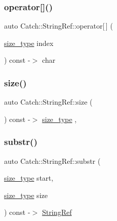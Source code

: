 \subsubsection{\texorpdfstring{operator[]()}{operator[]()}}
{\footnotesize\ttfamily auto Catch\+::\+String\+Ref\+::operator\mbox{[}$\,$\mbox{]} (\begin{DoxyParamCaption}\item[{\mbox{\hyperlink{class_catch_1_1_string_ref_a06b4db8fc82b197004291cf370b2ba7c}{size\+\_\+type}}}]{index }\end{DoxyParamCaption}) const -\/$>$  char\hspace{0.3cm}{\ttfamily [noexcept]}}

\mbox{\label{class_catch_1_1_string_ref_ae084d72cb2952cee61a63ef36611d0ad}} 
\subsubsection{\texorpdfstring{size()}{size()}}
{\footnotesize\ttfamily auto Catch\+::\+String\+Ref\+::size (\begin{DoxyParamCaption}{ }\end{DoxyParamCaption}) const -\/$>$ \mbox{\hyperlink{class_catch_1_1_string_ref_a06b4db8fc82b197004291cf370b2ba7c}{size\+\_\+type}} \hspace{0.3cm}{\ttfamily [inline]}, {\ttfamily [noexcept]}}

\mbox{\label{class_catch_1_1_string_ref_a248568b467cf6599320903ae613c8eee}} 
\subsubsection{\texorpdfstring{substr()}{substr()}}
{\footnotesize\ttfamily auto Catch\+::\+String\+Ref\+::substr (\begin{DoxyParamCaption}\item[{\mbox{\hyperlink{class_catch_1_1_string_ref_a06b4db8fc82b197004291cf370b2ba7c}{size\+\_\+type}}}]{start,  }\item[{\mbox{\hyperlink{class_catch_1_1_string_ref_a06b4db8fc82b197004291cf370b2ba7c}{size\+\_\+type}}}]{size }\end{DoxyParamCaption}) const -\/$>$  \mbox{\hyperlink{class_catch_1_1_string_ref}{String\+Ref}}\hspace{0.3cm}{\ttfamily [noexcept]}}

